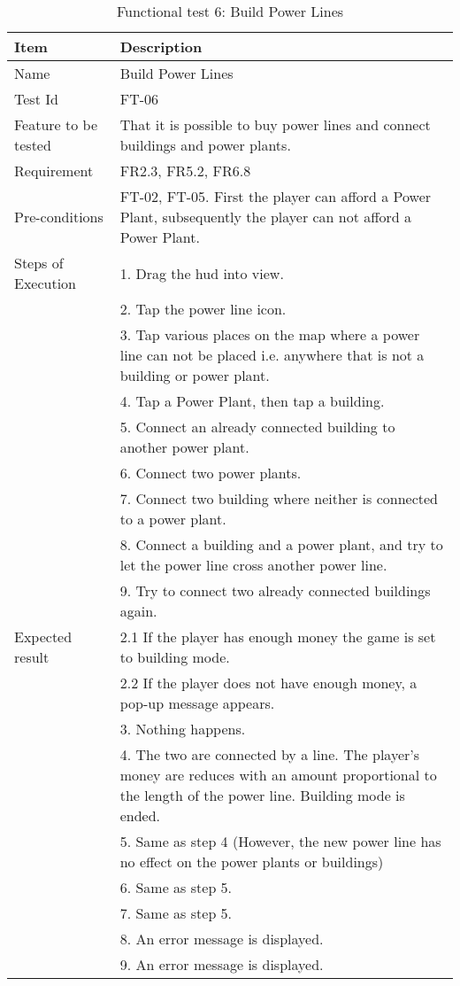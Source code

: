 \begin{table}[H]
\centering
	\begin{tabular}{ l | p{8cm} }
		\hline
		\rowcolor{lightgray}
		{\bf Item} & {\bf Description} \\ \hline
		Name & Build Power Lines \\ 
		Test Id & FT-06 \\ 
		Feature to be tested &  That it is possible to buy power lines and connect buildings and power plants. \\ 
		Requirement & FR2.3, FR5.2, FR6.8 \\ 
		Pre-conditions & FT-02, FT-05. First the player can afford a Power Plant, subsequently the player can not afford a Power Plant.\\ 
		Steps of Execution & 1. Drag the hud into view. \\
		& 2. Tap the power line icon. \\
		& 3. Tap various places on the map where a power line can not be placed i.e. anywhere that is not a building or power plant. \\
		& 4. Tap a Power Plant, then tap a building. \\
		& 5. Connect an already connected building to another power plant. \\
		& 6. Connect two power plants. \\
		& 7. Connect two building where neither is connected to a power plant. \\
		& 8. Connect a building and a power plant, and try to let the power line cross another power line. \\
		& 9. Try to connect two already connected buildings again. \\
		Expected result & 2.1 If the player has enough money the game is set to building mode. \\
		& 2.2 If the player does not have enough money, a pop-up message appears. \\
		& 3. Nothing happens. \\
		& 4. The two are connected by a line. The player's money are reduces with an amount proportional to the length of the power line. Building mode is ended. \\
		& 5. Same as step 4 (However, the new power line has no effect on the power plants or buildings) \\
		& 6. Same as step 5. \\
		& 7. Same as step 5. \\
		& 8. An error message is displayed. \\
		& 9. An error message is displayed. \\
		\hline
	\end{tabular}
	\caption{Functional test 6: Build Power Lines}
\end{table}

